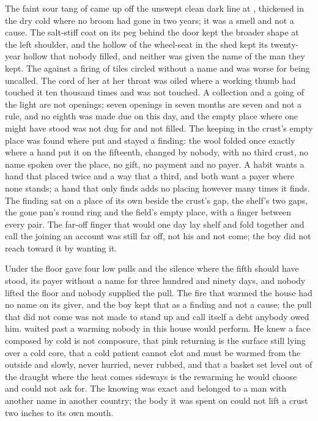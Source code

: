 The faint sour tang of  came up off the unswept clean dark line at , thickened in the dry cold where no broom had gone in two years; it was a smell and not a cause. The salt-stiff coat on its peg behind the door kept the broader shape at the left shoulder, and the hollow of the wheel-seat in the shed kept its twenty-year hollow that nobody filled, and neither was given the name of the man they kept. The  against a firing of tiles circled without a name and was worse for being uncalled. The cord of her  at her throat was oiled where a working thumb had touched it ten thousand times and was not touched. A collection and a going of the light are not openings; seven openings in seven months are seven and not a rule, and no eighth was made due on this day, and the empty place where one might have stood was not dug for and not filled. The keeping in the crust's empty place was found where put and stayed a finding: the wool folded once exactly where a hand put it on the fifteenth, changed by nobody, with no third crust, no name spoken over the place, no gift, no payment and no payer. A habit wants a hand that placed twice and a way that a third, and both want a payer where none stands; a hand that only finds adds no placing however many times it finds. The finding sat on a place of its own beside the crust's gap, the shelf's two gaps, the gone pan's round ring and the field's empty place, with a finger between every pair. The far-off finger that would one day lay shelf and fold together and call the joining an account was still far off, not his and not come; the boy did not reach toward it by wanting it.

Under the floor  gave four low pulls and the silence where the fifth should have stood, its payer without a name for three hundred and ninety days, and nobody lifted the floor and nobody supplied the pull. The fire that warmed the house had no name on its giver, and the boy kept that as a finding and not a cause; the pull that did not come was not made to stand up and call itself a debt anybody owed him.  waited past a warming nobody in this house would perform. He knew a face composed by cold is not composure, that pink returning is the surface still lying over a cold core, that a cold patient cannot clot and must be warmed from the outside and slowly, never hurried, never rubbed, and that a basket set level out of the draught where the heat comes sideways is the rewarming he would choose and could not ask for. The knowing was exact and belonged to a man with another name in another country; the body it was spent on could not lift a crust two inches to its own mouth.

